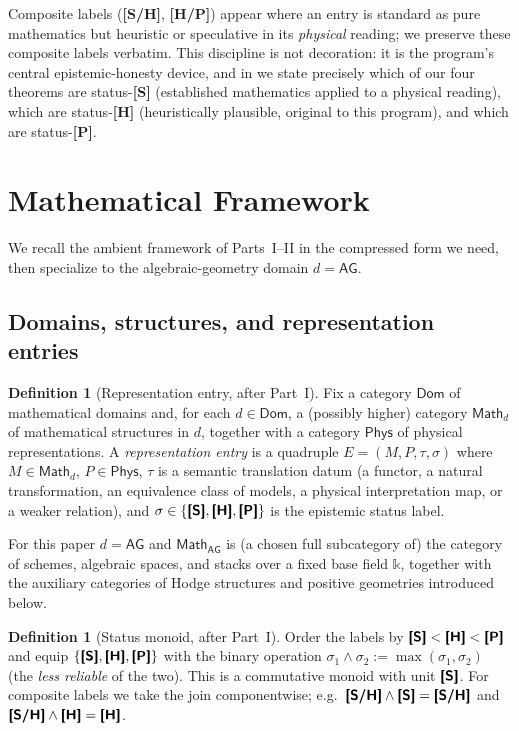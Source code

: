 \documentclass[12pt]{article}
\theoremstyle{definition}
\newtheorem{definition}[theorem]{Definition}
\theoremstyle{remark}
\newcommand{\Dom}{\mathsf{Dom}}
\newcommand{\Math}{\mathsf{Math}}
\newcommand{\Phys}{\mathsf{Phys}}
\newcommand{\coeff}{\mathbb{k}}
\newcommand{\status}[1]{\textnormal{\textsf{\textbf{[#1]}}}}
\begin{document}
Composite labels (\status{S/H}, \status{H/P}) appear where an entry is standard as pure mathematics
but heuristic or speculative in its \emph{physical} reading; we preserve these composite labels
verbatim. This discipline is not decoration: it is the program's central epistemic-honesty device, and
in  we state precisely which of our four theorems are status-\status{S}
(established mathematics applied to a physical reading), which are status-\status{H} (heuristically
plausible, original to this program), and which are status-\status{P}.

\section{Mathematical Framework}
\label{sec:framework}

We recall the ambient framework of Parts~I--II in the compressed form we need, then specialize to the
algebraic-geometry domain $d = \mathsf{AG}$.

\subsection{Domains, structures, and representation entries}

\begin{definition}[Representation entry, after Part~I]
\label{def:repentry}
Fix a category $\Dom$ of mathematical domains and, for each $d\in\Dom$, a (possibly higher) category
$\Math_d$ of mathematical structures in $d$, together with a category $\Phys$ of physical
representations. A \emph{representation entry} is a quadruple $E=(M,P,\tau,\sigma)$ where
$M\in\Math_d$, $P\in\Phys$, $\tau$ is a semantic translation datum (a functor, a natural
transformation, an equivalence class of models, a physical interpretation map, or a weaker relation),
and $\sigma\in\{\status{S},\status{H},\status{P}\}$ is the epistemic status label.
\end{definition}

For this paper $d=\mathsf{AG}$ and $\Math_{\mathsf{AG}}$ is (a chosen full subcategory of) the category
of schemes, algebraic spaces, and stacks over a fixed base field $\coeff$, together with the auxiliary
categories of Hodge structures and positive geometries introduced below.

\begin{definition}[Status monoid, after Part~I]
\label{def:statusmonoid}
Order the labels by $\status{S} < \status{H} < \status{P}$ and equip $\{\status{S},\status{H},\status{P}\}$
with the binary operation $\sigma_1\wedge\sigma_2 := \max(\sigma_1,\sigma_2)$ (the \emph{less reliable}
of the two). This is a commutative monoid with unit $\status{S}$. For composite labels we take the join
componentwise; e.g.\ $\status{S/H}\wedge\status{S}=\status{S/H}$ and $\status{S/H}\wedge\status{H}=\status{H}$.
\end{definition}
\end{document}

